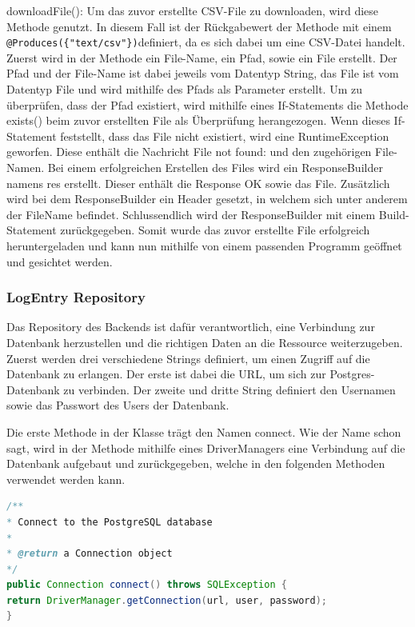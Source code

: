 \begin{compactitem}
\item downloadFile(): Um das zuvor erstellte CSV-File zu downloaden, wird diese Methode genutzt. In diesem Fall ist der Rückgabewert der Methode mit einem \\ \texttt{@Produces(\{"text/csv"\})}definiert, da es sich dabei um eine CSV-Datei handelt. Zuerst wird in der Methode ein File-Name, ein Pfad, sowie ein File erstellt. Der Pfad und der File-Name ist dabei jeweils vom Datentyp String, das File ist vom Datentyp File und wird mithilfe des Pfads als Parameter erstellt. Um zu überprüfen, dass der Pfad existiert, wird mithilfe eines If-Statements die Methode exists() beim zuvor erstellten File als Überprüfung herangezogen. Wenn dieses If-Statement feststellt, dass das File nicht existiert, wird eine RuntimeException geworfen. Diese enthält die Nachricht \glqq File not found: \grqq{} und den zugehörigen File-Namen. Bei einem erfolgreichen Erstellen des Files wird ein ResponseBuilder namens res erstellt. Dieser enthält die Response OK sowie das File. Zusätzlich wird bei dem ResponseBuilder ein Header gesetzt, in welchem sich unter anderem der FileName befindet. Schlussendlich wird der ResponseBuilder mit einem Build-Statement zurückgegeben. Somit wurde das zuvor erstellte File erfolgreich heruntergeladen und kann nun mithilfe von einem passenden Programm geöffnet und gesichtet werden.
\end{compactitem}


\subsubsection{LogEntry Repository}
Das Repository des Backends ist dafür verantwortlich, eine Verbindung zur Datenbank herzustellen und die richtigen Daten an die Ressource weiterzugeben. Zuerst werden drei verschiedene Strings definiert, um einen Zugriff auf die Datenbank zu erlangen. Der erste ist dabei die URL, um sich zur Postgres-Datenbank zu verbinden. Der zweite und dritte String definiert den Usernamen sowie das Passwort des Users der Datenbank.


Die erste Methode in der Klasse trägt den Namen connect. Wie der Name schon sagt, wird in der Methode mithilfe eines DriverManagers eine Verbindung auf die Datenbank aufgebaut und zurückgegeben, welche in den folgenden Methoden verwendet werden kann.


\begin{lstlisting}[language=java,caption=Connect to SQL Database,label=lst:impl:connect]
/**
* Connect to the PostgreSQL database
*
* @return a Connection object
*/
public Connection connect() throws SQLException {
return DriverManager.getConnection(url, user, password);
}
\end{lstlisting}


